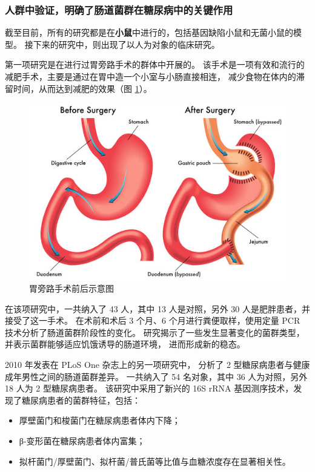 \documentclass[]{ctexbook}
\providecommand{\tightlist}{%
  \setlength{\itemsep}{0pt}\setlength{\parskip}{0pt}}
\begin{document}
\hypertarget{ux4ebaux7fa4ux4e2dux9a8cux8bc1ux660eux786eux4e86ux80a0ux9053ux83ccux7fa4ux5728ux7cd6ux5c3fux75c5ux4e2dux7684ux5173ux952eux4f5cux7528}{%
\subsubsection{人群中验证，明确了肠道菌群在糖尿病中的关键作用}\label{ux4ebaux7fa4ux4e2dux9a8cux8bc1ux660eux786eux4e86ux80a0ux9053ux83ccux7fa4ux5728ux7cd6ux5c3fux75c5ux4e2dux7684ux5173ux952eux4f5cux7528}}

截至目前，所有的研究都是在\textbf{小鼠}中进行的，包括基因缺陷小鼠和无菌小鼠的模型。
接下来的研究中，则出现了以人为对象的临床研究。

第一项研究是在进行过胃旁路手术的群体中开展的\citep{furetDifferentialAdaptationHuman2010}。
该手术是一项有效和流行的减肥手术，主要是通过在胃中造一个小室与小肠直接相连，
减少食物在体内的滞留时间，从而达到减肥的效果（图 \ref{fig:gastric-bypass}）。

\begin{figure}
\includegraphics[width=0.5\linewidth]{./images/gastric-bypass} \caption{胃旁路手术前后示意图}\label{fig:gastric-bypass}
\end{figure}

在该项研究中，一共纳入了 43 人，其中 13 人是对照，另外 30 人是肥胖患者，并接受了这一手术。
在术前和术后 3 个月、6 个月进行粪便取样，使用定量 PCR 技术分析了肠道菌群阶段性的变化。
研究揭示了一些发生显著变化的菌群类型，并表示菌群能够适应饥饿诱导的肠道环境，
进而形成新的稳态。

2010 年发表在 PLoS One 杂志上的另一项研究中，
分析了 2 型糖尿病患者与健康成年男性之间的肠道菌群差异\citep{larsenGutMicrobiotaHuman2010}。
一共纳入了 54 名对象，其中 36 人为对照，另外 18 人为 2 型糖尿病患者。
该研究中采用了新兴的 16S rRNA 基因测序技术，发现了糖尿病患者的菌群特征，包括：

\begin{itemize}
\tightlist
\item
  厚壁菌门和梭菌门在糖尿病患者体内下降；
\item
  β-变形菌在糖尿病患者体内富集；
\item
  拟杆菌门/厚壁菌门、拟杆菌/普氏菌等比值与血糖浓度存在显著相关性。
\end{itemize}
\end{document}
